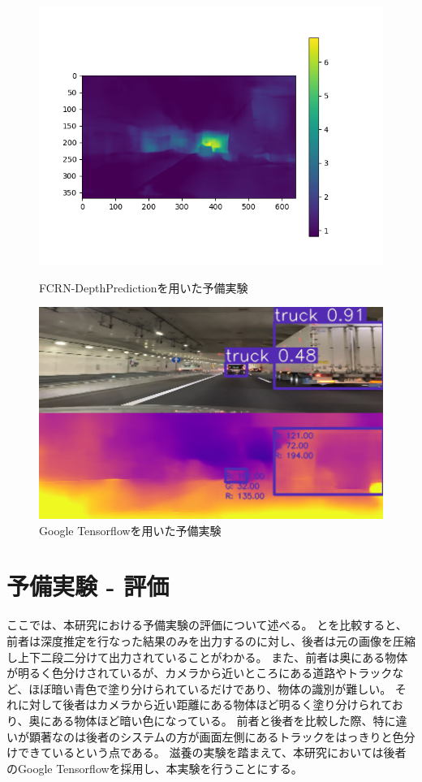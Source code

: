 \begin{figure}[htbp]
   \begin{center}
    \includegraphics[width=12cm]{figs/preex1.png}
   \end{center}
   \caption{FCRN-DepthPredictionを用いた予備実験}
   \label{fig:preex1}

  \begin{center}
   \includegraphics[width=12cm]{figs/preex2.png}
  \end{center}
   \caption{Google Tensorflowを用いた予備実験}
   \label{fig:preex2}
 \end{figure}

\newpage

\section{予備実験 - 評価}
ここでは、本研究における予備実験の評価について述べる。
とを比較すると、前者は深度推定を行なった結果のみを出力するのに対し、後者は元の画像を圧縮し上下二段二分けて出力されていることがわかる。
また、前者は奥にある物体が明るく色分けされているが、カメラから近いところにある道路やトラックなど、ほぼ暗い青色で塗り分けられているだけであり、物体の識別が難しい。
それに対して後者はカメラから近い距離にある物体ほど明るく塗り分けられており、奥にある物体ほど暗い色になっている。
前者と後者を比較した際、特に違いが顕著なのは後者のシステムの方が画面左側にあるトラックをはっきりと色分けできているという点である。
滋養の実験を踏まえて、本研究においては後者のGoogle Tensorflowを採用し、本実験を行うことにする。

